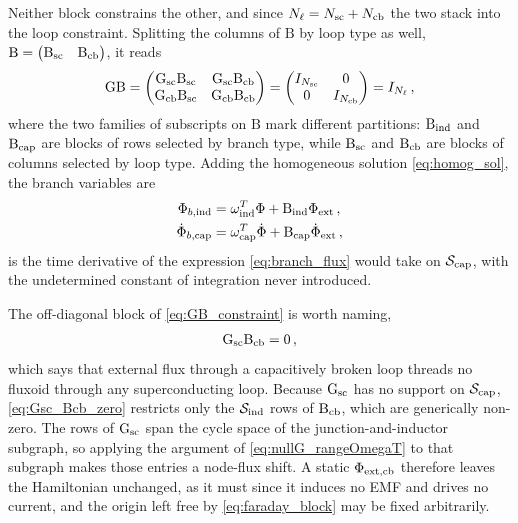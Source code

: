\documentclass[10pt,aps,pra,onecolumn,superscriptaddress,floatfix,nofootinbib]{revtex4-2}
\begin{document}
Neither block constrains the other, and since $N_\ell = N_{\rm sc} + N_{\rm cb}$ the two stack into the loop constraint.
Splitting the columns of $\mathrm{B}$ by loop type as well, $\mathrm{B} = \begin{pmatrix} \mathrm{B}_{\rm sc} & \mathrm{B}_{\rm cb}\end{pmatrix}$, it reads
\begin{align}
    \mathrm{G}\mathrm{B} = \begin{pmatrix} \mathrm{G}_{\rm sc}\mathrm{B}_{\rm sc} & \mathrm{G}_{\rm sc}\mathrm{B}_{\rm cb} \\ \mathrm{G}_{\rm cb}\mathrm{B}_{\rm sc} & \mathrm{G}_{\rm cb}\mathrm{B}_{\rm cb} \end{pmatrix}
    = \begin{pmatrix} I_{N_{\rm sc}} & 0 \\ 0 & I_{N_{\rm cb}} \end{pmatrix} = I_{N_\ell} \, ,
    \label{eq:GB_constraint}
\end{align}
where the two families of subscripts on $\mathrm{B}$ mark different partitions: $\mathrm{B}_{\rm ind}$ and $\mathrm{B}_{\rm cap}$ are blocks of rows selected by branch type, while $\mathrm{B}_{\rm sc}$ and $\mathrm{B}_{\rm cb}$ are blocks of columns selected by loop type.
Adding the homogeneous solution \cref{eq:homog_sol}, the branch variables are
\begin{align}
    \Phi_{b,\rm ind} &= \omega_{\rm ind}^T\Phi + \mathrm{B}_{\rm ind}\Phi_{\rm ext} \, , \label{eq:branch_flux} \\
    \dot\Phi_{b,\rm cap} &= \omega_{\rm cap}^T\dot\Phi + \mathrm{B}_{\rm cap}\dot\Phi_{\rm ext} \, , \label{eq:branch_flux_cap}
\end{align}
 is the time derivative of the expression \cref{eq:branch_flux} would take on $\mathcal{S}_{\rm cap}$, with the undetermined constant of integration never introduced.

The off-diagonal block of \cref{eq:GB_constraint} is worth naming,
\begin{align}
    \mathrm{G}_{\rm sc}\mathrm{B}_{\rm cb} = 0 \, ,
    \label{eq:Gsc_Bcb_zero}
\end{align}
which says that external flux through a capacitively broken loop threads no fluxoid through any superconducting loop.
Because $\mathrm{G}_{\rm sc}$ has no support on $\mathcal{S}_{\rm cap}$, \cref{eq:Gsc_Bcb_zero} restricts only the $\mathcal{S}_{\rm ind}$ rows of $\mathrm{B}_{\rm cb}$, which are generically non-zero.
The rows of $\mathrm{G}_{\rm sc}$ span the cycle space of the junction-and-inductor subgraph, so applying the argument of \cref{eq:nullG_rangeOmegaT} to that subgraph makes those entries a node-flux shift.
A static $\Phi_{\rm ext, cb}$ therefore leaves the Hamiltonian unchanged, as it must since it induces no EMF and drives no current, and the origin left free by \cref{eq:faraday_block} may be fixed arbitrarily.
\end{document}
